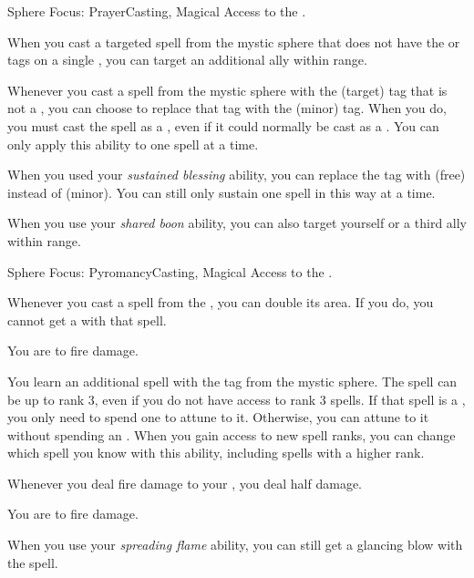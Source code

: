     \begin{magicalfeat}{Sphere Focus: Prayer}{Casting, Magical}
        \featpre Access to the  .

         When you cast a targeted spell from the  mystic sphere that does not have the  or  tags on a single , you can target an additional ally within range.

         Whenever you cast a spell from the  mystic sphere with the  (target) tag that is not a , you can choose to replace that tag with the  (minor) tag.
        When you do, you must cast the spell as a , even if it could normally be cast as a .
        You can only apply this ability to one spell at a time.

         When you used your \textit{sustained blessing} ability, you can replace the tag with  (free) instead of  (minor).
        You can still only sustain one spell in this way at a time.

         When you use your \textit{shared boon} ability, you can also target yourself or a third ally within range.
    \end{magicalfeat}

    \begin{magicalfeat}{Sphere Focus: Pyromancy}{Casting, Magical}
        \featpre Access to the  .

         Whenever you cast a spell from the  , you can double its area.
        If you do, you cannot get a  with that spell.

         You are  to fire damage.

         You learn an additional spell with the  tag from the  mystic sphere.
        The spell can be up to rank 3, even if you do not have access to rank 3 spells.
        If that spell is a , you only need to spend one  to attune to it.
        Otherwise, you can attune to it without spending an .
        When you gain access to new spell ranks, you can change which spell you know with this ability, including spells with a higher rank.

         Whenever you deal fire damage to your , you deal half damage.

         You are  to fire damage.

         When you use your \textit{spreading flame} ability, you can still get a glancing blow with the spell.
    \end{magicalfeat}


